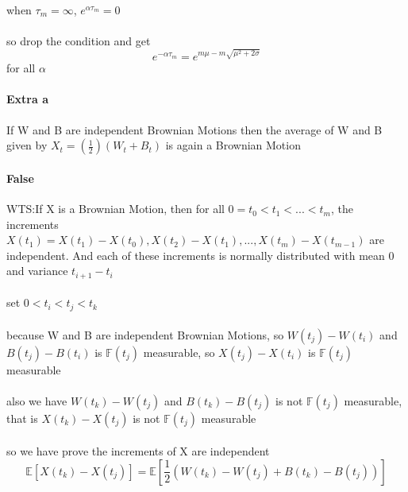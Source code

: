 \documentclass{article}
\begin{document}
\paragraph{}{when $\tau_{m}=\infty$, $e^{\alpha\tau_{m}}=0$}
\paragraph{}{so drop the condition and get \begin{displaymath}
                                             e^{-\alpha \tau_{m}}=e^{m\mu-m\sqrt{\mu^2+2\sigma}}
                                           \end{displaymath} for all $\alpha$}
\paragraph{ Extra a}{If W and B are independent Brownian Motions then the average of W and B given by $X_{t}=(\frac{1}{2})(W_{t}+B_{t})$ is again a Brownian Motion}
\paragraph{False}{WTS:If X is a Brownian Motion, then for all $0=t_{0}<t_{1}<...<t_m$, the increments $X(t_1)=X(t_1)-X(t_0),X(t_2)-X(t_1),...,X(t_m)-X(t_{m-1})$ are independent. And each of these increments is normally distributed with mean 0 and variance $t_{i+1}-t_i$}
\paragraph{}{set $0< t_i<t_j<t_k$}
\paragraph{}{because W and B are independent Brownian Motions, so $W(t_j)-W(t_i)$ and $B(t_j)-B(t_i)$ is $\mathbb{F}(t_j)$ measurable, so $X(t_j)-X(t_i)$ is $\mathbb{F}(t_j)$ measurable}
\paragraph{}{also we have $W(t_k)-W(t_j)$ and $B(t_k)-B(t_j)$ is not $\mathbb{F}(t_j)$ measurable, that is $X(t_k)-X(t_j)$ is not $\mathbb{F}(t_j)$ measurable}
\paragraph{}{so we have prove the increments of X are independent}
\begin{displaymath}
  \mathbb{E}[X(t_k)-X(t_j)]=\mathbb{E}[\frac{1}{2}(W(t_k)-W(t_j)+B(t_k)-B(t_j))]
\end{displaymath}
\end{document}
